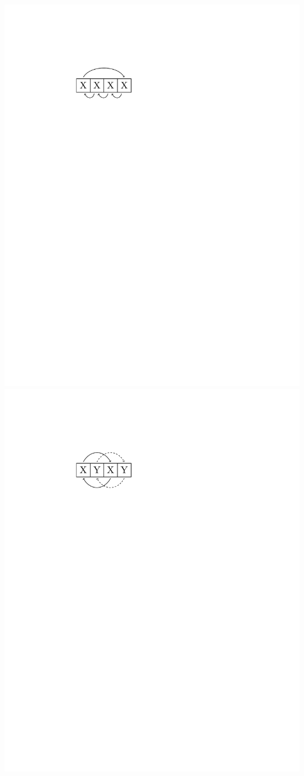 \documentclass[12pt,onecolumn%
]{scrartcl}
\begin{document}
{ \includegraphics[scale=0.6,trim=140 585 345 130, clip]{img/group_XXXX}  \includegraphics[scale=0.6,trim=140 585 345 130, clip]{img/group_XYXY} \\
}
\end{document}
